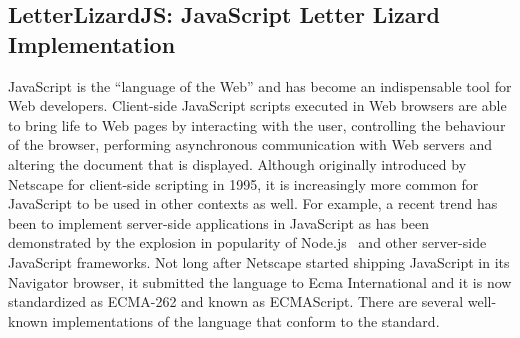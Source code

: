 \FloatBarrier
\subsection{LetterLizardJS: JavaScript Letter Lizard Implementation}


JavaScript is the ``language of the Web'' and has become an indispensable 
tool for Web developers. Client-side JavaScript scripts executed in Web
browsers are able to bring life to Web pages by interacting with the user,
controlling the behaviour of the browser, performing asynchronous communication
with Web servers and altering the document that is displayed. Although originally
introduced by Netscape for client-side scripting in 1995, it is increasingly
more common for JavaScript to be used in other contexts as well. For example,
a recent trend has been to implement server-side applications in JavaScript as
has been demonstrated by the explosion in popularity of Node.js~\cite{nodejs} and other
server-side JavaScript frameworks. Not long after Netscape started shipping 
JavaScript in its Navigator browser, it submitted the language to Ecma International
and it is now standardized as ECMA-262 and known as ECMAScript.
There are several well-known implementations of the language that conform to the standard.



